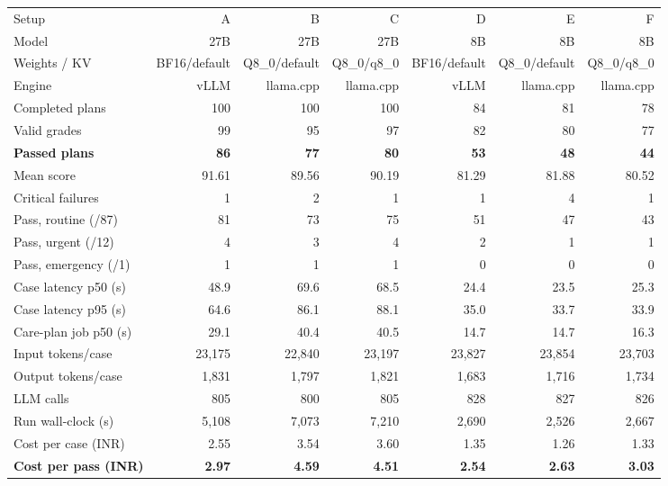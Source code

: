 \begin{tabular}{@{}lrrrrrr@{}}
\toprule
Setup & A & B & C & D & E & F \\
Model & 27B & 27B & 27B & 8B & 8B & 8B \\
Weights / KV & BF16/default & Q8\_0/default & Q8\_0/q8\_0 & BF16/default & Q8\_0/default & Q8\_0/q8\_0 \\
Engine & vLLM & llama.cpp & llama.cpp & vLLM & llama.cpp & llama.cpp \\
\midrule
Completed plans & 100 & 100 & 100 & 84 & 81 & 78 \\
Valid grades & 99 & 95 & 97 & 82 & 80 & 77 \\
\textbf{Passed plans} & \textbf{86} & \textbf{77} & \textbf{80} & \textbf{53} & \textbf{48} & \textbf{44} \\
Mean score & 91.61 & 89.56 & 90.19 & 81.29 & 81.88 & 80.52 \\
Critical failures & 1 & 2 & 1 & 1 & 4 & 1 \\
Pass, routine (/87) & 81 & 73 & 75 & 51 & 47 & 43 \\
Pass, urgent (/12) & 4 & 3 & 4 & 2 & 1 & 1 \\
Pass, emergency (/1) & 1 & 1 & 1 & 0 & 0 & 0 \\
\midrule
Case latency p50 (s) & 48.9 & 69.6 & 68.5 & 24.4 & 23.5 & 25.3 \\
Case latency p95 (s) & 64.6 & 86.1 & 88.1 & 35.0 & 33.7 & 33.9 \\
Care-plan job p50 (s) & 29.1 & 40.4 & 40.5 & 14.7 & 14.7 & 16.3 \\
Input tokens/case & 23,175 & 22,840 & 23,197 & 23,827 & 23,854 & 23,703 \\
Output tokens/case & 1,831 & 1,797 & 1,821 & 1,683 & 1,716 & 1,734 \\
LLM calls & 805 & 800 & 805 & 828 & 827 & 826 \\
Run wall-clock (s) & 5,108 & 7,073 & 7,210 & 2,690 & 2,526 & 2,667 \\
\midrule
Cost per case (INR) & 2.55 & 3.54 & 3.60 & 1.35 & 1.26 & 1.33 \\
\textbf{Cost per pass (INR)} & \textbf{2.97} & \textbf{4.59} & \textbf{4.51} & \textbf{2.54} & \textbf{2.63} & \textbf{3.03} \\
\bottomrule
\end{tabular}
